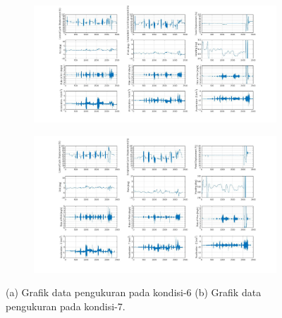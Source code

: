 \begin{figure}[H]
	\begin{subfigure}{0.5\textwidth}
		\centering
		\includegraphics[width=\linewidth]{gambar/Condition_6.jpg}
		\caption{}
		\label{fig:condition_6}
	\end{subfigure}
	\centering
	\begin{subfigure}{0.49\textwidth}
		\centering
		\includegraphics[width=\linewidth]{gambar/Condition_7.jpg}
		\caption{}
		\label{fig:condition_7}
	\end{subfigure}
	\caption{(a) Grafik data pengukuran pada kondisi-6 (b) Grafik data pengukuran pada kondisi-7.}
\end{figure}

